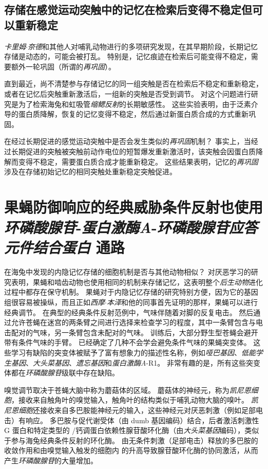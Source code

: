 \subsection{存储在感觉运动突触中的记忆在检索后变得不稳定但可以重新稳定}

\textit{卡里姆$\cdot$奈德}和其他人对哺乳动物进行的多项研究发现，在其早期阶段，长期记忆存储是动态的，可能会被打乱。
特别是，记忆痕迹在检索后可能变得不稳定，需要额外一轮巩固（所谓的\textit{再巩固}）。


直到最近，尚不清楚参与存储记忆的同一组突触是否在检索后不稳定和重新稳定，或者在记忆后突触重新激活后，一组新的突触是否受到调节。
对这个问题进行研究是为了检索海兔和虹吸管\textit{缩鳃反射}的长期敏感性。
这些实验表明，由于泛素介导的蛋白质降解，恢复的记忆变得不稳定，然后通过新蛋白质合成的方式重新巩固。


在经过长期促进的感觉运动突触中是否会发生类似的\textit{再巩固}机制？
事实上，当经过长期促进的突触被突触前动作电位的短暂爆发重新激活时，该突触会因蛋白质降解而变得不稳定，需要蛋白质合成才能重新稳定。
这些结果表明，记忆的\textit{再巩固}涉及在存储初始记忆的相同突触处重新稳定突触促进。



\section{果蝇防御响应的经典威胁条件反射也使用\textit{环磷酸腺苷}-\textit{蛋白激酶A}-\textit{环磷酸腺苷应答元件结合蛋白} 通路}

在海兔中发现的内隐记忆存储的细胞机制是否与其他动物相似？
对厌恶学习的研究表明，果蝇和啮齿动物也使用相同的机制来存储记忆，这表明整个\textit{后生动物}进化过程中都存在保守机制。
果蝇对于内隐记忆存储的研究特别方便，因为它的基因组很容易被操纵，而且正如\textit{西摩$\cdot$本泽}和他的同事首先证明的那样，果蝇可以进行经典调节。
在典型的经典条件反射范例中，气味伴随着对脚的反复电击。
然后通过允许苍蝇在迷宫的两条臂之间进行选择来检查学习的程度，其中一条臂包含与电击配对的气味，另一条臂包含未配对的气味。
训练后，大部分野生型苍蝇会避开带有条件气味的手臂。
已经确定了几种不会学会避免条件气味的果蝇突变体。
这些学习有缺陷的突变体被赋予了富有想象力的描述性名称，例如\textit{哑巴基因}、\textit{低能学生基因}、\textit{大头菜基因}、\textit{遗忘基因}和\textit{蛋白激酶A}-R1。
非常有趣的是，所有这些突变体都在\textit{环磷酸腺苷}级联中存在缺陷。


嗅觉调节取决于苍蝇大脑中称为蘑菇体的区域。
蘑菇体的神经元，称为\textit{凯尼恩细胞}，接收来自触角叶的嗅觉输入，触角叶的结构类似于哺乳动物大脑的嗅叶。
\textit{凯尼恩细胞}还接收来自多巴胺能神经元的输入，这些神经元对厌恶刺激（例如足部电击）有响应。
多巴胺与促代谢受体（由 dumb 基因编码）结合，后者激活刺激性 G 蛋白和特定类型的 /钙调蛋白依赖性腺苷酸环化酶（由\textit{大头菜基因}编码），类似于参与海兔经典条件反射的环化酶。
由无条件刺激（足部电击）释放的多巴胺的收敛作用和由嗅觉输入触发的细胞内  的升高导致腺苷酸环化酶的协同激活，从而产生\textit{环磷酸腺苷}的大量增加。


